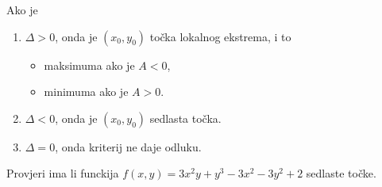 \noindent
Ako je
\begin{enumerate}
    \item $\Delta > 0$, onda je $(x_0,y_0)$ točka lokalnog ekstrema, i to
    \begin{itemize}
        \item maksimuma ako je $A < 0$,
        \item minimuma ako je $A > 0$.
    \end{itemize}
    \item $\Delta < 0$, onda je $(x_0, y_0)$ sedlasta točka.
    \item $\Delta = 0$, onda kriterij ne daje odluku.
\end{enumerate}

\begin{example}
    Provjeri ima li funckija $f(x,y) = 3x^2y+y^3-3x^2-3y^2+2$ sedlaste točke.
\end{example}


